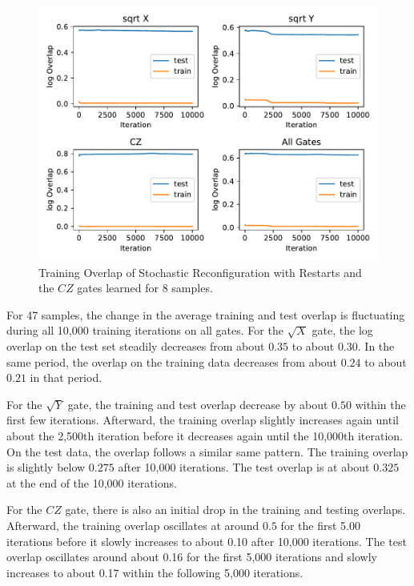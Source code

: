 \begin{figure}[H]
  \centering
  \includegraphics[width=\textwidth]{figures/results/SR-restarts-learned/avgOverlap_8.pdf}
  \caption[Training Overlap of Stochastic Reconfiguration with Restarts Learned]{Training 
  Overlap of Stochastic Reconfiguration with Restarts and the $CZ$ gates learned for 8 samples.}
  \label{fig:sr_overlap_8}
\end{figure}

For 47 samples, the change in the average training and test overlap is fluctuating during all 10,000
training iterations on all gates. For the 
$\sqrt{X}$ gate, the log overlap on the test set steadily decreases from 
about $0.35$ to about $0.30$. In the same period, the overlap on the training data decreases from about $0.24$ to about $0.21$ 
in that period.

For the $\sqrt{Y}$ gate, the training and test overlap decrease by about $0.50$ within the first few iterations. 
Afterward, the training overlap slightly increases again until about the 2,500th iteration before it decreases again 
until the 10,000th iteration. On the test data, the overlap follows a similar same pattern. The 
training overlap is slightly below $0.275$ after 10,000 iterations. The test overlap is at about $0.325$ 
at the end of the 10,000 iterations. 

For the $CZ$ gate, there is also an initial drop in the training and testing overlaps. Afterward, 
the training overlap oscillates at around $0.5$ for the first 5.00 iterations before it slowly increases to about 
0.10 after 10,000 iterations. The test overlap oscillates around about 0.16 for the first 5,000 iterations and 
slowly increases to about 0.17 within the following 5,000 iterations. 

